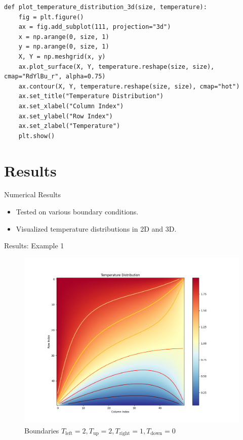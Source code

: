 \documentclass[aspectratio=169]{beamer}
\begin{document}
\begin{frame}[fragile]
\begin{lstlisting}[style=Python]
def plot_temperature_distribution_3d(size, temperature):
    fig = plt.figure()
    ax = fig.add_subplot(111, projection="3d")
    x = np.arange(0, size, 1)
    y = np.arange(0, size, 1)
    X, Y = np.meshgrid(x, y)
    ax.plot_surface(X, Y, temperature.reshape(size, size), cmap="RdYlBu_r", alpha=0.75)
    ax.contour(X, Y, temperature.reshape(size, size), cmap="hot")
    ax.set_title("Temperature Distribution")
    ax.set_xlabel("Column Index")
    ax.set_ylabel("Row Index")
    ax.set_zlabel("Temperature")
    plt.show()
\end{lstlisting}
\end{frame}




\section{Results}

\begin{frame}{Numerical Results}
  \begin{itemize}
    \item Tested on various boundary conditions.
    \item Visualized temperature distributions in 2D and 3D.
  \end{itemize}
\end{frame}

\begin{frame}{Results: Example 1}
  \begin{figure}
    \includegraphics[width=0.45\linewidth]{figures/Figure_1.png}
    \caption{Boundaries $T_{\text{left}}=2, T_{\text{up}}=2, T_{\text{right}}=1, T_{\text{down}}=0$}
  \end{figure}
\end{frame}
\end{document}
